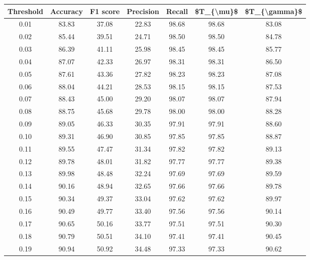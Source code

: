 \begin{tabular}{|c|c|c|c|c|c|c|}
\hline
 Threshold &  Accuracy &  F1 score &  Precision &  Recall &  \$T\_\{\textbackslash mu\}\$ &  \$T\_\{\textbackslash gamma\}\$ \\
\hline
      0.01 &     83.83 &     37.08 &      22.83 &   98.68 &      98.68 &         83.08 \\
      0.02 &     85.44 &     39.51 &      24.71 &   98.50 &      98.50 &         84.78 \\
      0.03 &     86.39 &     41.11 &      25.98 &   98.45 &      98.45 &         85.77 \\
      0.04 &     87.07 &     42.33 &      26.97 &   98.31 &      98.31 &         86.50 \\
      0.05 &     87.61 &     43.36 &      27.82 &   98.23 &      98.23 &         87.08 \\
      0.06 &     88.04 &     44.21 &      28.53 &   98.15 &      98.15 &         87.53 \\
      0.07 &     88.43 &     45.00 &      29.20 &   98.07 &      98.07 &         87.94 \\
      0.08 &     88.75 &     45.68 &      29.78 &   98.00 &      98.00 &         88.28 \\
      0.09 &     89.05 &     46.33 &      30.35 &   97.91 &      97.91 &         88.60 \\
      0.10 &     89.31 &     46.90 &      30.85 &   97.85 &      97.85 &         88.87 \\
      0.11 &     89.55 &     47.47 &      31.34 &   97.82 &      97.82 &         89.13 \\
      0.12 &     89.78 &     48.01 &      31.82 &   97.77 &      97.77 &         89.38 \\
      0.13 &     89.98 &     48.48 &      32.24 &   97.69 &      97.69 &         89.59 \\
      0.14 &     90.16 &     48.94 &      32.65 &   97.66 &      97.66 &         89.78 \\
      0.15 &     90.34 &     49.37 &      33.04 &   97.62 &      97.62 &         89.97 \\
      0.16 &     90.49 &     49.77 &      33.40 &   97.56 &      97.56 &         90.14 \\
      0.17 &     90.65 &     50.16 &      33.77 &   97.51 &      97.51 &         90.30 \\
      0.18 &     90.79 &     50.51 &      34.10 &   97.41 &      97.41 &         90.45 \\
      0.19 &     90.94 &     50.92 &      34.48 &   97.33 &      97.33 &         90.62 \\

\end{tabular}
